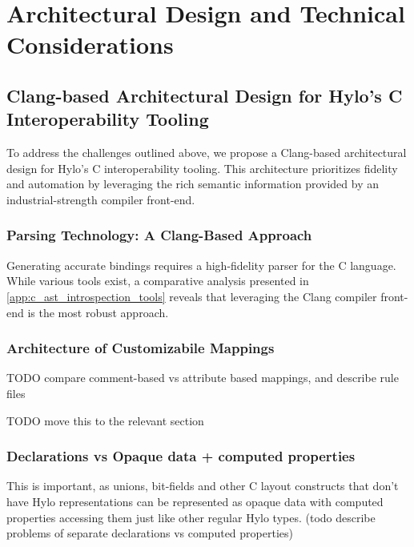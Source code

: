 \section{Architectural Design and Technical Considerations}
\label{sec:architectural_design}


\subsection{Clang-based Architectural Design for Hylo's C Interoperability Tooling}

To address the challenges outlined above, we propose a Clang-based architectural design for Hylo's C interoperability tooling. This architecture prioritizes fidelity and automation by leveraging the rich semantic information provided by an industrial-strength compiler front-end.

\subsubsection{Parsing Technology: A Clang-Based Approach}
Generating accurate bindings requires a high-fidelity parser for the C language. While various tools exist, a comparative analysis presented in \autoref{app:c_ast_introspection_tools} reveals that leveraging the Clang compiler front-end is the most robust approach.
\subsubsection{Architecture of Customizabile Mappings}
TODO compare comment-based vs attribute based mappings, and describe rule files

TODO move this to the relevant section



\subsubsection{Declarations vs Opaque data + computed properties}
This is important, as unions, bit-fields and other C layout constructs that don't have Hylo representations can be represented as opaque data with computed properties accessing them just like other regular Hylo types. (todo describe problems of separate declarations vs computed properties)

